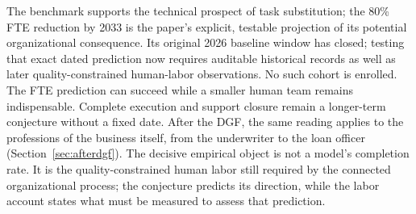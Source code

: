 The benchmark supports the technical prospect of task substitution; the 80\% FTE reduction
by 2033 is the paper's explicit, testable projection of its potential organizational consequence.
Its original 2026 baseline window has closed; testing that exact dated prediction now requires
auditable historical records as well as later quality-constrained human-labor observations.
No such cohort is enrolled. The FTE prediction can succeed while a smaller human team remains indispensable.
Complete execution and support closure remain a longer-term conjecture without a fixed date.
After the DGF, the same reading applies to the professions
of the business itself, from the underwriter to the loan officer (Section~\ref{sec:afterdgf}). The
decisive empirical object is not a model's completion rate. It is the quality-constrained human labor still required by the
connected organizational process; the conjecture predicts its direction, while the labor account
states what must be measured to assess that prediction.
